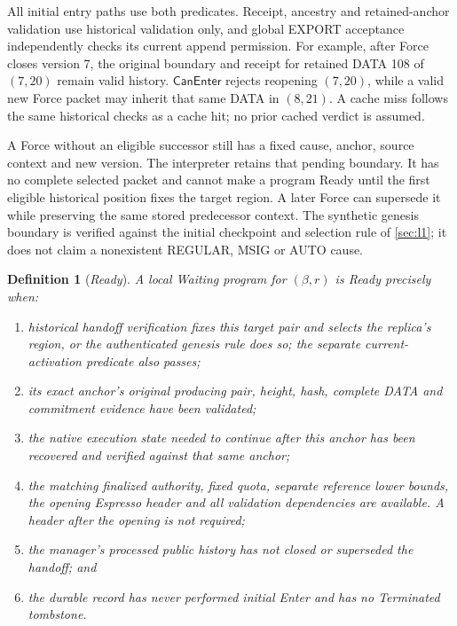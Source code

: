 \documentclass[11pt,a4paper]{article}
\newcommand{\tagg}[1]{\ensuremath{\mathsf{#1}}}
\newcommand{\defterm}[1]{\textcolor{rrBlue}{\textit{#1}}}
\newtheorem{definition}{Definition}[section]
\begin{document}
All initial entry paths use both predicates. Receipt, ancestry and
retained-anchor validation use historical validation only, and global
EXPORT acceptance independently checks its current append permission.
For example, after Force closes version 7, the original boundary and
receipt for retained DATA 108 of $(7,20)$ remain valid history.
$\tagg{CanEnter}$ rejects reopening $(7,20)$, while a valid new Force
packet may inherit that same DATA in $(8,21)$. A cache miss follows the
same historical checks as a cache hit; no prior cached verdict is assumed.

A Force without an eligible successor still has a fixed cause,
anchor, source context and new version. The interpreter retains that
pending boundary. It has no complete selected packet and cannot make
a program Ready until the first eligible historical position fixes
the target region. A later Force can supersede it while preserving the
same stored predecessor context. The synthetic genesis boundary is
verified against the initial checkpoint and selection rule of
\cref{sec:l1}; it does not claim a nonexistent REGULAR, MSIG or AUTO
cause.

\begin{definition}[\defterm{Ready}]
\label{def:ready}
A local Waiting program for $(\beta,r)$ is Ready precisely when:
\begin{enumerate}[label=(\roman*)]
\item historical handoff verification fixes this target pair and selects the
replica's region, or the authenticated genesis rule does so; the separate
current-activation predicate also passes;
\item its exact anchor's original producing pair, height, hash,
complete DATA and commitment evidence have been validated;
\item the native execution state needed to continue after this
anchor has been recovered and verified against that same anchor;
\item the matching finalized authority, fixed quota, separate
reference lower bounds, the opening Espresso header and all validation
dependencies are available. A header after the opening is not required;
\item the manager's processed public history has not closed or
superseded the handoff; and
\item the durable record has never performed initial Enter and has
no Terminated tombstone.
\end{enumerate}
\end{definition}
\end{document}
